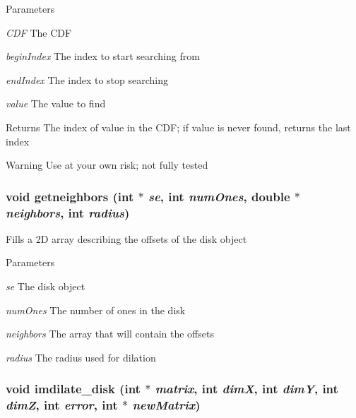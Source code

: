 \begin{DoxyParams}{Parameters}
\item[{\em CDF}]The CDF \item[{\em beginIndex}]The index to start searching from \item[{\em endIndex}]The index to stop searching \item[{\em value}]The value to find \end{DoxyParams}
\begin{DoxyReturn}{Returns}
The index of value in the CDF; if value is never found, returns the last index 
\end{DoxyReturn}
\begin{DoxyWarning}{Warning}
Use at your own risk; not fully tested 
\end{DoxyWarning}
\hypertarget{ex__particle__CUDA__naive__full_8cu_a2a8357e06057d48a030afcb481081349}{
\subsubsection[{getneighbors}]{\setlength{\rightskip}{0pt plus 5cm}void getneighbors (int $\ast$ {\em se}, \/  int {\em numOnes}, \/  double $\ast$ {\em neighbors}, \/  int {\em radius})}}
\label{ex__particle__CUDA__naive__full_8cu_a2a8357e06057d48a030afcb481081349}
Fills a 2D array describing the offsets of the disk object 
\begin{DoxyParams}{Parameters}
\item[{\em se}]The disk object \item[{\em numOnes}]The number of ones in the disk \item[{\em neighbors}]The array that will contain the offsets \item[{\em radius}]The radius used for dilation \end{DoxyParams}
\hypertarget{ex__particle__CUDA__naive__full_8cu_a707e839d9152f9bf820dee64c6627f5b}{
\subsubsection[{imdilate\_\-disk}]{\setlength{\rightskip}{0pt plus 5cm}void imdilate\_\-disk (int $\ast$ {\em matrix}, \/  int {\em dimX}, \/  int {\em dimY}, \/  int {\em dimZ}, \/  int {\em error}, \/  int $\ast$ {\em newMatrix})}}
